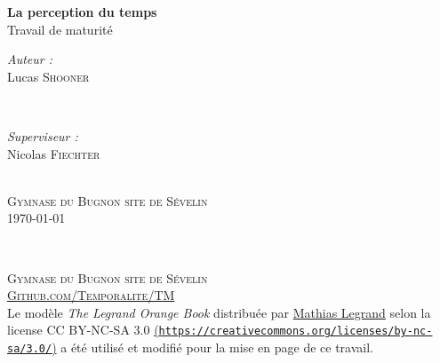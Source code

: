\documentclass[12pt,fleqn,oneside,openany,]{book} %
\begin{document}

\begingroup
\thispagestyle{empty}
\centering
\vspace*{6,8cm}
\par\normalfont\fontsize{35}{35}\sffamily\selectfont

\textbf{La perception du temps}\\
{\LARGE Travail de maturité}\par %
\vspace*{0,8cm}
\begin{minipage}{0.445\textwidth}
	\begin{flushleft} \large
		\emph{Auteur :}\\
		{\Large Lucas \textsc{Shooner}} %
	\end{flushleft}
\end{minipage}
~
\begin{minipage}{0.445\textwidth}
	\begin{flushright} \large
		\emph{Superviseur :} \\
		{\Large Nicolas \textsc{Fiechter}} %
	\end{flushright}
\end{minipage} \\ 
{{\large \textsc{Gymnase du Bugnon site de Sévelin}}} \\
{\large \today}\\ \par
\endgroup


\newpage
~\vfill
\thispagestyle{empty}

\noindent \textsc{Gymnase du Bugnon site de Sévelin}\\

\noindent \textsc{\href{http://github.com/Temporalite/TM}{Github.com/Temporalite/TM}}\\ %

\noindent Le modèle \emph{The Legrand Orange Book} distribuée par \href{legrand.mathias@gmail.com}{Mathias Legrand}
 selon la license CC BY-NC-SA 3.0 \href{https://creativecommons.org/licenses/by-nc-sa/3.0/}{ (\texttt{https://creativecommons.org/licenses/by-nc-sa/3.0/})} a été utilisé et modifié pour la mise en page de ce travail. \\ %
\end{document}
